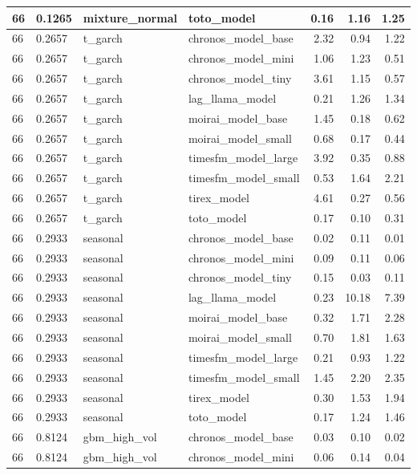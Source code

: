 {\begin{tabular}{llllrrr}
\midrule
66 & 0.1265 & mixture\_normal & toto\_model & 0.16 & 1.16 & 1.25 \\
\midrule
66 & 0.2657 & t\_garch & chronos\_model\_base & 2.32 & 0.94 & 1.22 \\
\midrule
66 & 0.2657 & t\_garch & chronos\_model\_mini & 1.06 & 1.23 & 0.51 \\
\midrule
66 & 0.2657 & t\_garch & chronos\_model\_tiny & 3.61 & 1.15 & 0.57 \\
\midrule
66 & 0.2657 & t\_garch & lag\_llama\_model & 0.21 & 1.26 & 1.34 \\
\midrule
66 & 0.2657 & t\_garch & moirai\_model\_base & 1.45 & 0.18 & 0.62 \\
\midrule
66 & 0.2657 & t\_garch & moirai\_model\_small & 0.68 & 0.17 & 0.44 \\
\midrule
66 & 0.2657 & t\_garch & timesfm\_model\_large & 3.92 & 0.35 & 0.88 \\
\midrule
66 & 0.2657 & t\_garch & timesfm\_model\_small & 0.53 & 1.64 & 2.21 \\
\midrule
66 & 0.2657 & t\_garch & tirex\_model & 4.61 & 0.27 & 0.56 \\
\midrule
66 & 0.2657 & t\_garch & toto\_model & 0.17 & 0.10 & 0.31 \\
\midrule
66 & 0.2933 & seasonal & chronos\_model\_base & 0.02 & 0.11 & 0.01 \\
\midrule
66 & 0.2933 & seasonal & chronos\_model\_mini & 0.09 & 0.11 & 0.06 \\
\midrule
66 & 0.2933 & seasonal & chronos\_model\_tiny & 0.15 & 0.03 & 0.11 \\
\midrule
66 & 0.2933 & seasonal & lag\_llama\_model & 0.23 & 10.18 & 7.39 \\
\midrule
66 & 0.2933 & seasonal & moirai\_model\_base & 0.32 & 1.71 & 2.28 \\
\midrule
66 & 0.2933 & seasonal & moirai\_model\_small & 0.70 & 1.81 & 1.63 \\
\midrule
66 & 0.2933 & seasonal & timesfm\_model\_large & 0.21 & 0.93 & 1.22 \\
\midrule
66 & 0.2933 & seasonal & timesfm\_model\_small & 1.45 & 2.20 & 2.35 \\
\midrule
66 & 0.2933 & seasonal & tirex\_model & 0.30 & 1.53 & 1.94 \\
\midrule
66 & 0.2933 & seasonal & toto\_model & 0.17 & 1.24 & 1.46 \\
\midrule
66 & 0.8124 & gbm\_high\_vol & chronos\_model\_base & 0.03 & 0.10 & 0.02 \\
\midrule
66 & 0.8124 & gbm\_high\_vol & chronos\_model\_mini & 0.06 & 0.14 & 0.04 \\

\end{tabular}}
